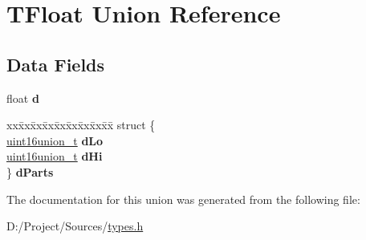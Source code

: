 \hypertarget{union_t_float}{}\section{T\+Float Union Reference}
\label{union_t_float}
\subsection*{Data Fields}
\begin{DoxyCompactItemize}
\item 
\hypertarget{union_t_float_a5261069e995f7e1b2b3b7580c954996b}{}float {\bfseries d}\label{union_t_float_a5261069e995f7e1b2b3b7580c954996b}

\item 
\hypertarget{union_t_float_a0be8d25ac4e10f4014f6993ac0740f21}{}\begin{tabbing}
xx\=xx\=xx\=xx\=xx\=xx\=xx\=xx\=xx\=\kill
struct \{\\
\>\hyperlink{unionuint16union__t}{uint16union\_t} {\bfseries dLo}\\
\>\hyperlink{unionuint16union__t}{uint16union\_t} {\bfseries dHi}\\
\} {\bfseries dParts}\label{union_t_float_a0be8d25ac4e10f4014f6993ac0740f21}
\\

\end{tabbing}\end{DoxyCompactItemize}


The documentation for this union was generated from the following file\+:\begin{DoxyCompactItemize}
\item 
D\+:/\+Project/\+Sources/\hyperlink{types_8h}{types.\+h}\end{DoxyCompactItemize}
